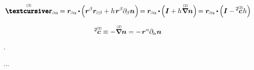 \begin{otherlanguage}{russian}
\begin{equation*}
\threedimensionallocation_\differentialindex{\alpha} \hspace{-0.2ex}
= \locationvector_\differentialindex{\alpha} \hspace{-0.15ex} \dotp \hspace{-0.16ex}
\Bigl(
\locationvector^\beta \locationvector_\differentialindex{\beta}
+ h \hspace{.2ex} \locationvector^\beta \hspace{-0.1ex} \partial_{\hspace{-0.1ex}\beta} \unitnormalvector
\Bigr) \hspace{-0.3ex}
= \locationvector_\differentialindex{\alpha} \hspace{-0.15ex} \dotp \hspace{-0.16ex}
\Bigl(
\twoparameterunitdyad \hspace{.1ex}
+ h \hspace{.1ex} \boldnablaflat \unitnormalvector
\Bigr) \hspace{-0.3ex}
= \locationvector_\differentialindex{\alpha} \hspace{-0.15ex} \dotp \hspace{-0.12ex}
\Bigl(
\twoparameterunitdyad \hspace{.1ex}
- \hspace{-0.15ex} \twoparameterbivalent{\bm{c}} \hspace{.2ex} h
\Bigr)
\end{equation*}

  

\nopagebreak\vspace{-0.12em}\ru{\vspace{-0.1em}}\begin{equation}
\twoparameterbivalent{\bm{c}} \hspace{.1ex} \equiv - \boldnablaflat \unitnormalvector = - \hspace{.2ex} \locationvector^\alpha \hspace{-0.1ex} \partial_{\hspace{-0.1ex}\alpha} \unitnormalvector
\end{equation}

\nopagebreak\vspace{-0.25em}\noindent
{} .

...


\end{otherlanguage}
